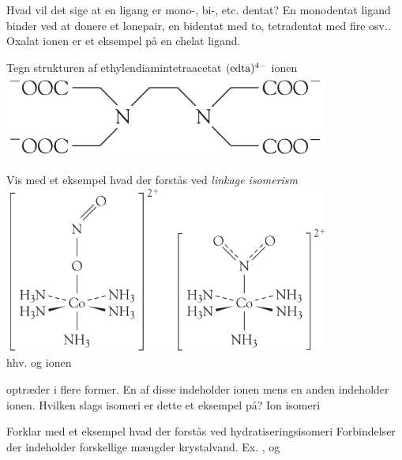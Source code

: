 
\begin{flashcard}[Teori]{Hvad vil det sige at en ligang er mono-, bi-, etc. dentat?}
En monodentat ligand binder ved at donere et lonepair, en bidentat med to, tetradentat med fire osv.. Oxalat ionen er et eksempel på en chelat ligand.
\end{flashcard}

\begin{flashcard}[Struktur]{Tegn strukturen af ethylendiamintetraacetat $(\rm edta)^{4-}$ ionen}
\includegraphics[width=0.8\textwidth]{figures/k19s503edta.png}
\end{flashcard}

\begin{flashcard}[Teori]{Vis med et eksempel hvad der forstås ved \textit{linkage isomerism}}
\includegraphics[width=0.8\textwidth]{figures/k19s504linkageisomerism.png}\\\vspace*{0.7cm}
hhv.  og  ionen
\end{flashcard}

\begin{flashcard}[Teori]{ optræder i flere former. En af disse indeholder  ionen mens en anden indeholder \ce{[CoSO4(NH3)5]^{+}} ionen. Hvilken slags isomeri er dette et eksempel på?}
Ion isomeri
\end{flashcard}

\begin{flashcard}[Teori]{Forklar med et eksempel hvad der forstås ved hydratiseringsisomeri}
Forbindelser der indeholder forskellige mængder krystalvand.
Ex. ,  og 
\end{flashcard}

